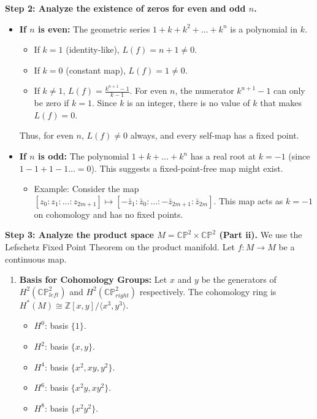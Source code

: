 \begin{solution}
\textbf{Step 2: Analyze the existence of zeros for even and odd $n$.}
\begin{itemize}
    \item \textbf{If $n$ is even:} The geometric series $1 + k + k^2 + \dots + k^n$ is a polynomial in $k$. 
    \begin{itemize}
        \item If $k = 1$ (identity-like), $L(f) = n+1 \neq 0$.
        \item If $k = 0$ (constant map), $L(f) = 1 \neq 0$.
        \item If $k \neq 1$, $L(f) = \frac{k^{n+1} - 1}{k - 1}$. For even $n$, the numerator $k^{n+1}-1$ can only be zero if $k=1$. Since $k$ is an integer, there is no value of $k$ that makes $L(f) = 0$.
    \end{itemize}
    Thus, for even $n$, $L(f) \neq 0$ always, and every self-map has a fixed point.
    \item \textbf{If $n$ is odd:} The polynomial $1 + k + \dots + k^n$ has a real root at $k = -1$ (since $1 - 1 + 1 - 1 \dots = 0$). This suggests a fixed-point-free map might exist.
    \begin{itemize}
        \item Example: Consider the map $[z_0 : z_1 : \dots : z_{2m+1}] \mapsto [-\bar{z}_1 : \bar{z}_0 : \dots : -\bar{z}_{2m+1} : \bar{z}_{2m}]$. This map acts as $k=-1$ on cohomology and has no fixed points.
    \end{itemize}
\end{itemize}

\textbf{Step 3: Analyze the product space $M = \mathbb{CP}^2 \times \mathbb{CP}^2$ (Part ii).}
We use the Lefschetz Fixed Point Theorem on the product manifold. Let $f: M \to M$ be a continuous map.
\begin{enumerate}
    \item \textbf{Basis for Cohomology Groups:}
    Let $x$ and $y$ be the generators of $H^2(\mathbb{CP}^2_{left})$ and $H^2(\mathbb{CP}^2_{right})$ respectively. The cohomology ring is $H^*(M) \cong \mathbb{Z}[x, y] / \langle x^3, y^3 \rangle$. 
    \begin{itemize}
        \item $H^0$: basis $\{1\}$. 
        \item $H^2$: basis $\{x, y\}$. 
        \item $H^4$: basis $\{x^2, xy, y^2\}$.
        \item $H^6$: basis $\{x^2y, xy^2\}$.
        \item $H^8$: basis $\{x^2y^2\}$.
    \end{itemize}


\end{enumerate}
\end{solution}

